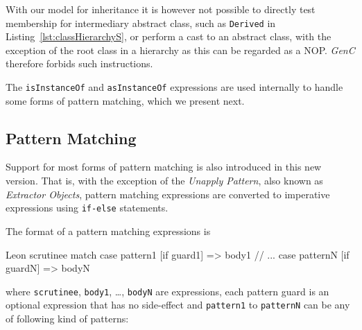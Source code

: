 \documentclass[a4paper,twoside]{article}
\newcommand{\InlineS}[1]{\lstinline[language=Leon]|#1|}
\newcommand{\GenC}{\emph{GenC}\xspace}
\newcommand{\RefCode}[1]{Listing~\ref{#1}}
\begin{document}
With our model for inheritance it is however not possible to directly test
membership for intermediary abstract class, such as \InlineS{Derived} in
\RefCode{lst:classHierarchyS}, or perform a cast to an abstract class, with the
exception of the root class in a hierarchy as this can be regarded as a NOP.
\GenC therefore forbids such instructions.

The \InlineS{isInstanceOf} and \InlineS{asInstanceOf} expressions are used
internally to handle some forms of pattern matching, which we present next.

\subsection{Pattern Matching}

Support for most forms of pattern matching is also introduced in this new
version. That is, with the exception of the \emph{Unapply Pattern}, also known
as \emph{Extractor Objects}, pattern matching expressions are converted to
imperative expressions using \InlineS{if-else} statements.

The format of a pattern matching expressions is
\begin{ShortCode}{Leon}
scrutinee match {
  case pattern1 [if guard1] => body1
  // ...
  case patternN [if guardN] => bodyN
}
\end{ShortCode}
where \InlineS{scrutinee}, \InlineS{body1}, \ldots, \InlineS{bodyN} are
expressions, each pattern guard is an optional expression that has no
side-effect and \InlineS{pattern1} to \InlineS{patternN} can be any of following
kind of patterns:
\end{document}

